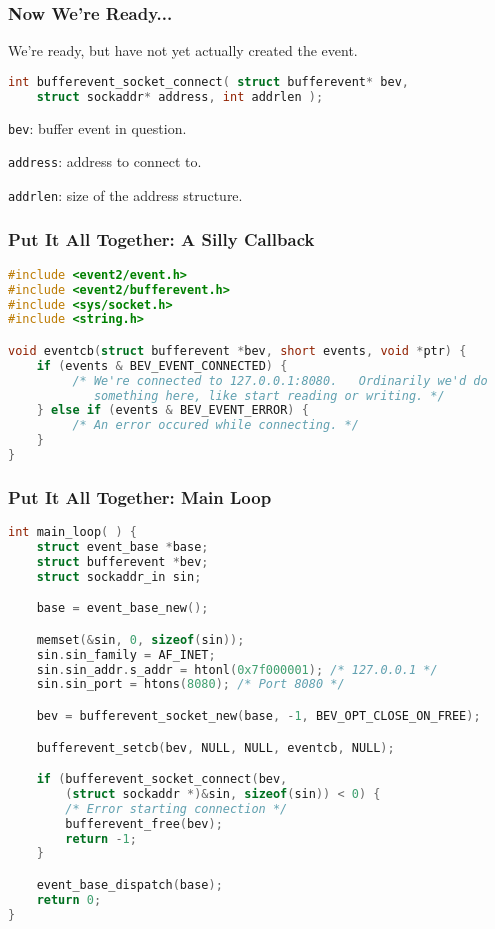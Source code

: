 \begin{frame}[fragile]
	\frametitle{Now We're Ready...}

	We're ready, but have not yet actually created the event.

	\begin{lstlisting}[language=C]
int bufferevent_socket_connect( struct bufferevent* bev, 
    struct sockaddr* address, int addrlen );
\end{lstlisting}

	\texttt{bev}: buffer event in question.

	\texttt{address}: address to connect to.

	\texttt{addrlen}: size of the address structure.

\end{frame}


\begin{frame}[fragile]
	\frametitle{Put It All Together: A Silly Callback}


	\begin{lstlisting}[language=C]
#include <event2/event.h>
#include <event2/bufferevent.h>
#include <sys/socket.h>
#include <string.h>

void eventcb(struct bufferevent *bev, short events, void *ptr) {
    if (events & BEV_EVENT_CONNECTED) {
         /* We're connected to 127.0.0.1:8080.   Ordinarily we'd do
            something here, like start reading or writing. */
    } else if (events & BEV_EVENT_ERROR) {
         /* An error occured while connecting. */
    }
}
\end{lstlisting}

\end{frame}

\begin{frame}[fragile]
	\frametitle{Put It All Together: Main Loop}

	\begin{lstlisting}[language=C]
int main_loop( ) {
    struct event_base *base;
    struct bufferevent *bev;
    struct sockaddr_in sin;

    base = event_base_new();

    memset(&sin, 0, sizeof(sin));
    sin.sin_family = AF_INET;
    sin.sin_addr.s_addr = htonl(0x7f000001); /* 127.0.0.1 */
    sin.sin_port = htons(8080); /* Port 8080 */

    bev = bufferevent_socket_new(base, -1, BEV_OPT_CLOSE_ON_FREE);

    bufferevent_setcb(bev, NULL, NULL, eventcb, NULL);

    if (bufferevent_socket_connect(bev,
        (struct sockaddr *)&sin, sizeof(sin)) < 0) {
        /* Error starting connection */
        bufferevent_free(bev);
        return -1;
    }

    event_base_dispatch(base);
    return 0;
}\end{lstlisting}

\end{frame}


